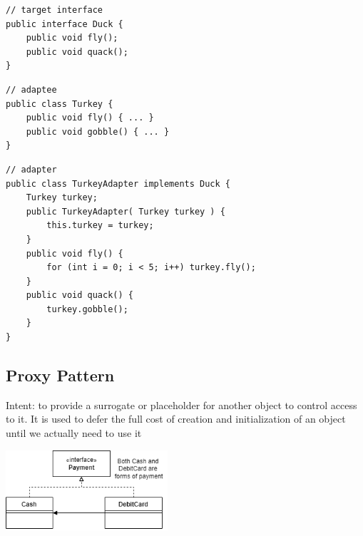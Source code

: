 \documentclass[8pt, letterpaper, titlepage]{article}
\begin{document}
\begin{multicols*}{2}
    \begin{lstlisting}
// target interface
public interface Duck {
    public void fly();
    public void quack();
} 
    \end{lstlisting}
    \begin{lstlisting}
// adaptee
public class Turkey {
    public void fly() { ... }
    public void gobble() { ... }
}
    \end{lstlisting}
    \begin{lstlisting}
// adapter
public class TurkeyAdapter implements Duck {
    Turkey turkey;
    public TurkeyAdapter( Turkey turkey ) {
        this.turkey = turkey;
    }
    public void fly() {
        for (int i = 0; i < 5; i++) turkey.fly();
    }
    public void quack() {
        turkey.gobble();
    }
}
    \end{lstlisting}
    \subsection*{Proxy Pattern}
    Intent: to provide a surrogate or placeholder for another object to control access to it. It is used to defer the full cost of creation and initialization of an object until we actually need to use it
    \begin{center} 
        \includegraphics[width=6cm]{proxy.png}
    \end{center}

    \newpage

\end{multicols*}
\end{document}
